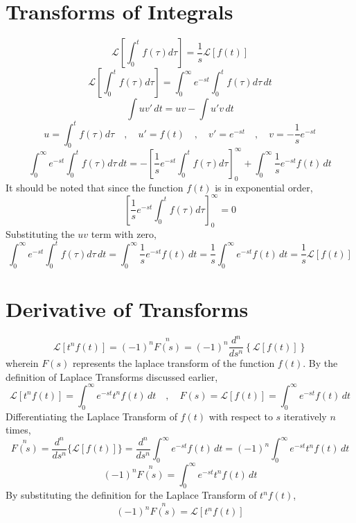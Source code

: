 \section{Transforms of Integrals}
\begin{comment}
\end{comment}
$$\mathcal{L}\left[\int^{t}_{0}f(\tau)d\tau\right] = \frac{1}{s}\mathcal{L}[f(t)]$$
$$\mathcal{L}\left[\int^{t}_{0}f(\tau)d\tau\right] = \int^{\infty}_{0}e^{-st}\int^{t}_{0}f(\tau)d\tau\,dt$$
$$\int uv' \,dt = uv - \int u'v \,dt$$
$$u = \int^{t}_{0}f(\tau)d\tau \quad,\quad u' = f(t) \quad,\quad v' = e^{-st} \quad,\quad v = -\frac{1}{s}e^{-st}$$
$$\int^{\infty}_{0}e^{-st}\int^{t}_{0}f(\tau)d\tau\,dt = -\left[\frac{1}{s}e^{-st}\int^{t}_{0}f(\tau)d\tau\right]^{\infty}_{0} + \int^{\infty}_{0}\frac{1}{s}e^{-st}f(t)\,dt$$
It should be noted that since the function $f(t)$ is in exponential order,
$$\left[\frac{1}{s}e^{-st}\int^{t}_{0}f(\tau)d\tau\right]^{\infty}_{0} = 0$$
Substituting the $uv$ term with zero,
$$\int^{\infty}_{0}e^{-st}\int^{t}_{0}f(\tau)d\tau\,dt = \int^{\infty}_{0}\frac{1}{s}e^{-st}f(t)\,dt = \frac{1}{s}\int^{\infty}_{0}e^{-st}f(t)\,dt = \frac{1}{s}\mathcal{L}[f(t)]$$
\section{Derivative of Transforms}
\begin{comment}
\end{comment}
$$\mathcal{L}[t^nf(t)] = (-1)^n\overset{n}{F(s)} = (-1)^n\frac{d^n}{ds^n}\left\{\mathcal{L}[f(t)]\right\}$$
wherein $F(s)$ represents the laplace transform of the function $f(t)$. By the definition of Laplace Transforms discussed earlier,
$$\mathcal{L}[t^nf(t)] = \int^{\infty}_{0}e^{-st}t^nf(t)\,dt\quad,\quad F(s) = \mathcal{L}[f(t)] = \int^{\infty}_{0}e^{-st}f(t)\,dt$$
Differentiating the Laplace Transform of $f(t)$ with respect to $s$ iteratively $n$ times,
$$\overset{n}{F(s)} = \frac{d^n}{ds^n}\{\mathcal{L}[f(t)]\} = \frac{d^n}{ds^n}\int^{\infty}_{0}e^{-st}f(t)\,dt = (-1)^n\int^{\infty}_{0}e^{-st}t^n f(t)\,dt$$
$$(-1)^n\overset{n}{F(s)} = \int^{\infty}_{0}e^{-st}t^n f(t)\,dt$$
By substituting the definition for the Laplace Transform of $\displaystyle{t^nf(t)}$,
$$(-1)^n\overset{n}{F(s)} = \mathcal{L}[t^nf(t)]$$
